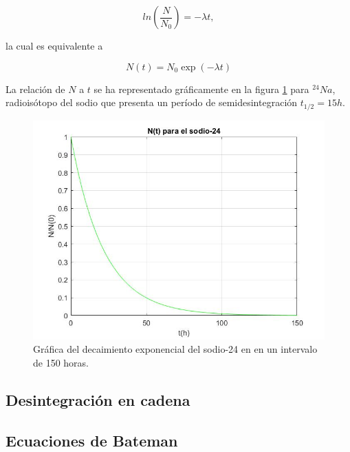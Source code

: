 \begin{equation*}
    ln\left( \frac{N}{N_0} \right) = - \lambda t,
\end{equation*}

\noindent la cual es equivalente a

\begin{equation*}
    N(t) = N_0 \exp(- \lambda t)
\end{equation*}

\noindent La relación de $N$ a $t$ se ha representado gráficamente en la figura \ref{decaimientodelsodio24} para $ ^{24} Na$, radioisótopo del sodio que presenta un período de semidesintegración $t_{1/2} = 15h$.

\begin{figure}
    \begin{center}
        \includegraphics[scale=0.5]{imagenes/decaimiento_sodio_24.jpg}
        \caption{Gráfica del decaimiento exponencial del sodio-24 en en un intervalo de 150 horas.}
        \label{decaimientodelsodio24}
    \end{center}
\end{figure}

\subsection{Desintegración en cadena}


\subsection{Ecuaciones de Bateman}

